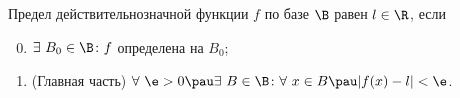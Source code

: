 
 	Предел действительнозначной функции $f$  по базе $\B$ равен $l\in\R$, если
 	\begin{enumerate}\setcounter{enumi}{-1}\renewcommand{\labelenumi}{\theenumi)}
 	  \item  $\exists\  B_0\in\B\colon f$ определена на $B_0$;
 	  \item  \label{BB1}(Главная часть) $\forall\  \e>0\pau \exists\  B\in\B\colon \forall\  x\in B\pau |f(x)-l|<\e$.
 	\end{enumerate}
 